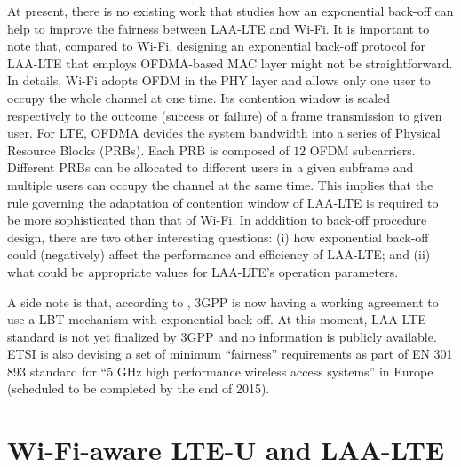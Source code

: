 At present, there is no existing work that studies how an exponential back-off can help to improve the fairness between LAA-LTE and Wi-Fi. It is important to note that, compared to Wi-Fi, designing an exponential back-off protocol for LAA-LTE that employs OFDMA-based MAC layer might not be straightforward. In details, Wi-Fi adopts OFDM in the PHY layer and allows only one user to occupy the whole channel at one time. Its contention window is scaled respectively to the outcome (success or failure) of a frame transmission to given user. For LTE, OFDMA devides the system bandwidth into a series of Physical Resource Blocks (PRBs). Each PRB is composed of $12$ OFDM subcarriers. Different PRBs can be allocated to different users in a given subframe and multiple users can occupy the channel at the same time. This implies that the rule governing the adaptation of contention window of LAA-LTE is required to be more sophisticated than that of Wi-Fi. In adddition to back-off procedure design, there are two other interesting questions: (i) how exponential back-off could (negatively) affect the performance and efficiency of LAA-LTE; and (ii) what could be appropriate values for LAA-LTE's operation parameters.

A side note is that, according to \cite{U-LTE-FCC-Cisco-2015}, 3GPP is now having a working agreement to use a LBT mechanism with exponential back-off. At this moment, LAA-LTE standard is not yet finalized by 3GPP and no information is publicly available. ETSI is also devising a set of minimum ``fairness'' requirements as part of EN 301 893 standard for ``5 GHz high performance wireless access systems'' in Europe (scheduled to be completed by the end of 2015).

\section{Wi-Fi-aware LTE-U and LAA-LTE}
\label{subsection:Wi-Fi-aware}

